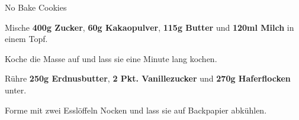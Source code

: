 \begin{recipe}[]{No Bake Cookies} %

\step
Mische \textbf{400g Zucker}, \textbf{60g Kakaopulver}, \textbf{115g Butter} und \textbf{120ml Milch} in einem Topf.

\step
Koche die Masse auf und lass sie eine Minute lang kochen.

\step
Rühre \textbf{250g Erdnusbutter}, \textbf{2 Pkt. Vanillezucker} und \textbf{270g Haferflocken} unter.

\step
Forme mit zwei Esslöffeln Nocken und lass sie auf Backpapier abkühlen.

\end{recipe}